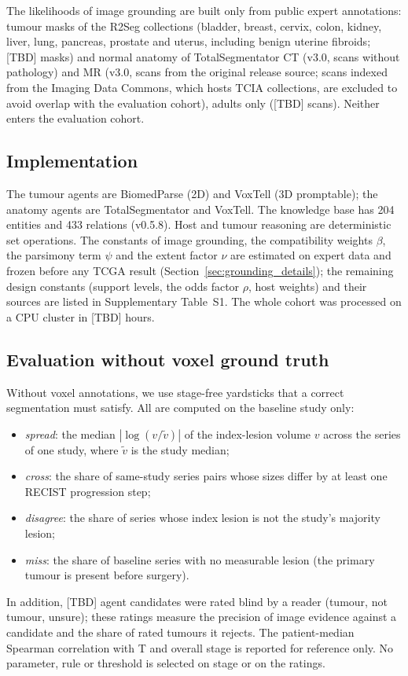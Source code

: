 \documentclass[fleqn,10pt]{olplainarticle}
\begin{document}
The likelihoods of image grounding are built only from public expert annotations: tumour masks of the R2Seg collections
(bladder, breast, cervix, colon, kidney, liver, lung, pancreas, prostate and uterus, including benign uterine fibroids;
[TBD] masks) and normal anatomy of
TotalSegmentator CT (v3.0, scans without pathology) and MR (v3.0, scans from the original release source; scans indexed from the
Imaging Data Commons, which hosts TCIA collections, are excluded to avoid overlap with the evaluation cohort), adults only ([TBD] scans). Neither enters the evaluation cohort.

\subsection{Implementation}
The tumour agents are BiomedParse (2D) and VoxTell (3D promptable); the anatomy agents are TotalSegmentator and VoxTell. The
knowledge base has 204 entities and 433 relations (v0.5.8). Host and tumour reasoning are deterministic set operations.
The constants of image grounding, the compatibility weights $\beta$, the parsimony term $\psi$ and the extent factor $\nu$
are estimated on expert data and frozen before any TCGA result (Section~\ref{sec:grounding_details}); the remaining design
constants (support levels, the odds factor $\rho$, host weights) and their sources are listed in Supplementary Table~S1. The whole cohort was processed on a CPU cluster in [TBD] hours.

\subsection{Evaluation without voxel ground truth}
\label{sec:eval_protocol}
Without voxel annotations, we use stage-free yardsticks that a correct segmentation must satisfy. All are computed on
the baseline study only:
\begin{itemize}
  \item \emph{spread}: the median $|\log(v/\tilde v)|$ of the index-lesion volume $v$ across the series of one study,
  where $\tilde v$ is the study median;
  \item \emph{cross}: the share of same-study series pairs whose sizes differ by at least one RECIST progression step;
  \item \emph{disagree}: the share of series whose index lesion is not the study's majority lesion;
  \item \emph{miss}: the share of baseline series with no measurable lesion (the primary tumour is present before
  surgery).
\end{itemize}
In addition, [TBD] agent candidates were rated blind by a reader (tumour, not tumour, unsure); these ratings measure the
precision of image evidence against a candidate and the share of rated tumours it rejects. The patient-median Spearman
correlation with T and overall stage is reported for reference only. No parameter, rule or threshold is selected on stage
or on the ratings.
\end{document}
